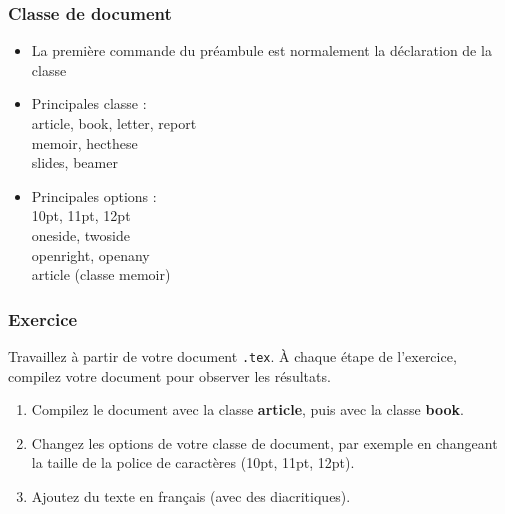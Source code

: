 
\begin{frame}[fragile]

	\frametitle{Classe de document}
	
	\begin{itemize}
		\item La première commande du préambule est normalement la déclaration de la classe
	\begin{codesource}
	\documentclass[options]{classe}
	\end{codesource}
				
		\pause
		
		\item Principales classe : \\
			article, book, letter, report \\
			memoir, hecthese \\
			slides, beamer
		
		\pause
		
		\item Principales options : \\
			10pt, 11pt, 12pt \\
			oneside, twoside \\
			openright, openany \\
			article (classe memoir)
	\end{itemize}
\end{frame}


\begin{frame}[c]

\frametitle{Exercice \thenoExercice}

Travaillez à partir de votre document \texttt{.tex}. À chaque étape de l'exercice, compilez votre
document pour observer les résultats.

\begin{enumerate}
	\item Compilez le document avec la classe \textbf{article}, puis avec la classe
		\textbf{book}.
	\item Changez les options de votre classe de document, par exemple en changeant la taille de la
		police de caractères (10pt, 11pt, 12pt).
	\item Ajoutez du texte en français (avec des diacritiques).
\end{enumerate}
\end{frame}

